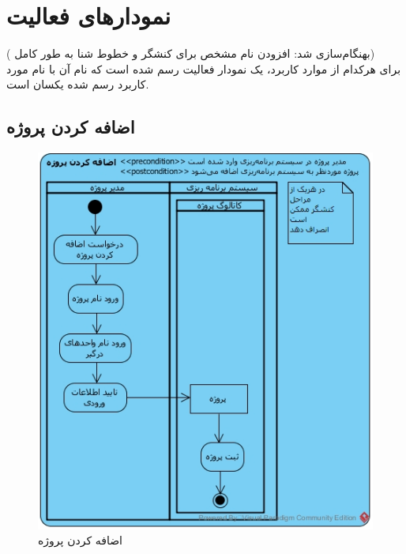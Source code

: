 \chapter{نمودارهای فعالیت}
({\color{red} بهنگام‌سازی شد: افزودن نام مشخص  برای کنشگر و خطوط شنا به طور کامل})
\\
برای هرکدام از موارد کاربرد، یک نمودار فعالیت رسم شده است که نام آن با نام مورد کاربرد رسم شده یکسان است.
\section{اضافه کردن پروژه}
\begin{figure}[H]
	\centering
	\includegraphics[scale=0.9]{img/activity/AddProjectToOrganization}
	\caption{اضافه کردن پروژه}
\end{figure}


